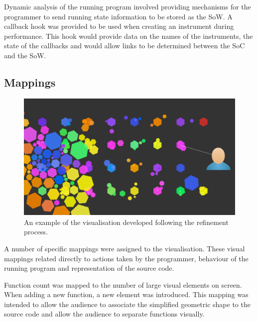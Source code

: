Dynamic analysis of the running program involved providing mechanisms for the programmer to send running state information to be stored as the \ac{SoW}. A callback hook was provided to be used when creating an instrument during performance. This hook would provide data on the names of the instruments, the state of the callbacks and would allow links to be determined between the \ac{SoC} and the \ac{SoW}.

\subsection{Mappings}

\begin{figure}
\centering
\includegraphics[width=\textwidth]{../images/final-visualisations/final-code-visualisation.png}
\caption{An example of the visualisation developed following the refinement process.}
\label{fig:final-visualisation}
\end{figure}

A number of specific mappings were assigned to the visualisation. These visual mappings related directly to actions taken by the programmer, behaviour of the running program and representation of the source code. 

Function count was mapped to the number of large visual elements on screen. When adding a new function, a new element was introduced. This mapping was intended to allow the audience to associate the simplified geometric shape to the source code and allow the audience to separate functions visually.


